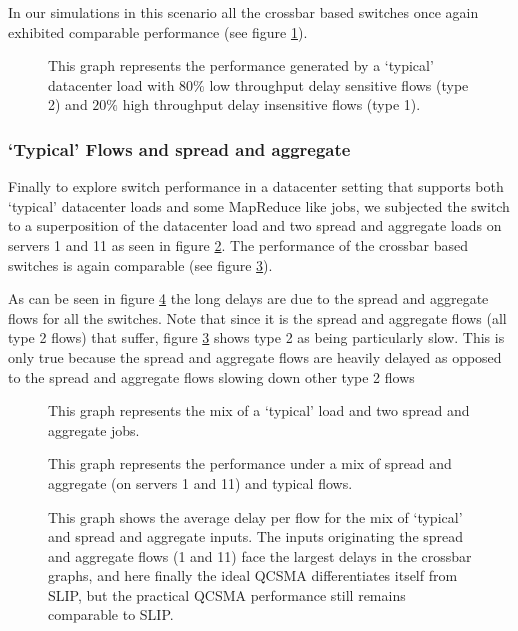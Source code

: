 \documentclass{IEEEtran}%
\begin{document}
In our simulations in this scenario all the crossbar based switches once again exhibited comparable performance (see figure \ref{typ_delays}).


\begin{figure}%
	\caption{This graph represents the performance generated by a `typical' datacenter load with $80\%$ low throughput delay sensitive flows (type 2) and $20\%$ high throughput delay insensitive flows (type 1).}
	\label{typ_delays}
\end{figure}

\subsubsection{`Typical' Flows and spread and aggregate}
Finally to explore switch performance in a datacenter setting that supports both  `typical' datacenter loads and some MapReduce like jobs, we subjected the switch to a superposition of the datacenter load and two spread and aggregate loads on servers 1 and 11 as seen in figure \ref{typ_mult2}.  The performance of the crossbar based switches is again comparable (see figure \ref{typ_mult2_delays}).

As can be seen in figure \ref{mixed_delay_matrix} the long delays are due to the spread and aggregate flows for all the switches.  Note that since it is the spread and aggregate flows (all type 2 flows) that suffer, figure \ref{typ_mult2_delays} shows type 2 as being particularly slow.  This is only true because the spread and aggregate flows are heavily delayed as opposed to the spread and aggregate flows slowing down other type 2 flows
\begin{figure}%
	\caption{This graph represents the mix of a `typical' load and two spread and aggregate jobs.}
	\label{typ_mult2}
\end{figure}

\begin{figure}%
	\caption{This graph represents the performance under a mix of spread and aggregate (on servers 1 and 11) and typical flows.}
	\label{typ_mult2_delays}
\end{figure}

\begin{figure}%
	\caption{This graph shows the average delay per flow for the mix of `typical' and spread and aggregate inputs.  The inputs originating the spread and aggregate flows (1 and 11) face the largest delays in the crossbar graphs, and here finally the ideal QCSMA differentiates itself from SLIP, but the practical QCSMA performance still remains comparable to SLIP.}
	\label{mixed_delay_matrix}
\end{figure}
\end{document}
